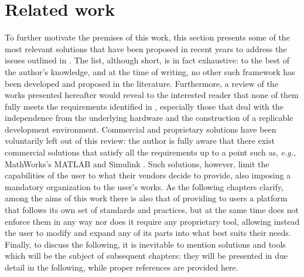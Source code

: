 \section{Related work}
\label{sec:prb_related_work}
To further motivate the premises of this work, this section presents some of the most relevant solutions that have been proposed in recent years to address the issues outlined in . The list, although short, is in fact exhaustive: to the best of the author's knowledge, and at the time of writing, no other such framework has been developed and proposed in the literature. Furthermore, a review of the works presented hereafter would reveal to the interested reader that none of them fully meets the requirements identified in , especially those that deal with the independence from the underlying hardware and the construction of a replicable development environment. Commercial and proprietary solutions have been voluntarily left out of this review: the author is fully aware that there exist commercial solutions that satisfy all the requirements up to a point such as, \emph{e.g.}, MathWorks's MATLAB \cite{mathworks_matlab_nodate} and Simulink \cite{mathworks_simulink_nodate}. Such solutions, however, limit the capabilities of the user to what their vendors decide to provide, also imposing a mandatory organization to the user's works. As the following chapters clarify, among the aims of this work there is also that of providing to users a platform that follows its own set of standards and practices, but at the same time does not enforce them in any way nor does it require any proprietary tool, allowing instead the user to modify and expand any of its parts into what best suits their needs. Finally, to discuss the following, it is inevitable to mention solutions and tools which will be the subject of subsequent chapters: they will be presented in due detail in the following, while proper references are provided here.

